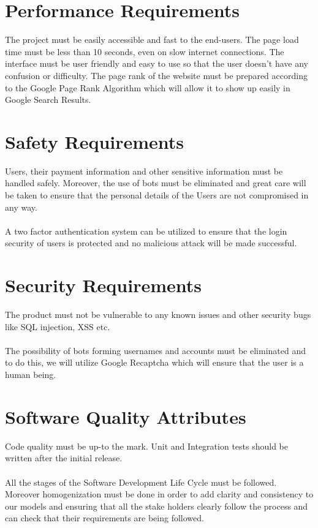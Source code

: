 \documentclass{scrreprt}
\begin{document}
\section{Performance Requirements}
The project must be easily accessible and fast to the end-users. The page load time must be less than 10 seconds, even on slow internet connections. The interface must be user friendly and easy to use so that the user doesn't have any confusion or difficulty. The page rank of the website must be prepared according to the Google Page Rank Algorithm which will allow it to show up easily in Google Search Results.

\section{Safety Requirements}
Users, their payment information and other sensitive information must be handled safely. Moreover, the use of bots must be eliminated and great care will be taken to ensure that the personal details of the Users are not compromised in any way.\\\\ A two factor authentication system can be utilized to ensure that the login security of users is protected and no malicious attack will be made successful.

\section{Security Requirements}
The product must not be vulnerable to any known issues and other security bugs like SQL injection, XSS etc.\\\\The possibility of bots forming usernames and accounts must be eliminated and to do this, we will utilize Google Recaptcha which will ensure that the user is a human being. 

\section{Software Quality Attributes}
Code quality must be up-to the mark. Unit and Integration tests should be written after the initial release.\\\\All the stages of the Software Development Life Cycle must be followed. Moreover homogenization must be done in order to add clarity and consistency to our models and ensuring that all the stake holders clearly follow the process and can check that their requirements are being followed.
\end{document}
